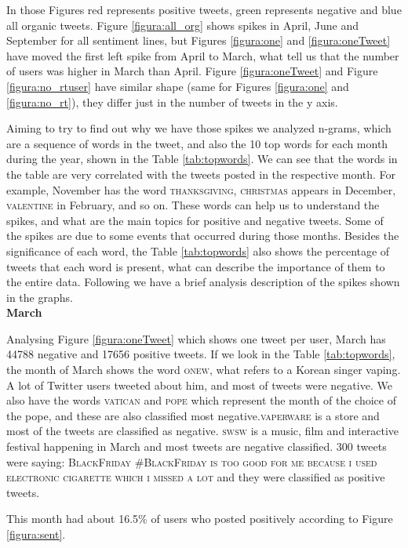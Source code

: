 \documentclass{sig-alternate}
\begin{document}
 In those Figures red represents positive tweets, green represents negative and blue all organic tweets. Figure \ref{figura:all_org} shows spikes in April, June and September for all sentiment lines, but Figures \ref{figura:one} and \ref{figura:oneTweet} have moved the first left spike from April to March, what tell us that the number of users was higher in March than April. Figure \ref{figura:oneTweet} and Figure \ref{figura:no_rtuser} have similar shape (same for 
Figures \ref{figura:one} and \ref{figura:no_rt}), they differ just in the number of tweets in the y axis. 

Aiming to try to find out why we have those spikes we analyzed n-grams, which are a sequence of words in the tweet, and also the 10 top words for each month during the year, shown in the Table \ref{tab:topwords}. We can see that the words in the table are very correlated with the tweets posted in the respective month. For example, November has the word \textsc{thanksgiving}, \textsc{christmas} appears in December, \textsc{valentine} in February, and so on. These words can help us to understand the spikes, and what are the main topics for positive and negative tweets. Some of the spikes are due to some events that occurred during those months. Besides the significance of each word, the Table \ref{tab:topwords} also shows the percentage of tweets that each word is present, what can describe the importance of them to the entire data. Following we have a brief analysis description of the spikes shown in the graphs. \\

\textbf{March}

Analysing Figure \ref{figura:oneTweet} which shows one tweet per user, March has 44788 negative and 17656 positive tweets. If we look in the Table \ref{tab:topwords}, the month of March shows the word \textsc{onew}, what refers to a Korean singer vaping. A lot of Twitter users tweeted about him, and most of tweets were negative. We also have the words \textsc{vatican} and \textsc{pope} which represent the month of the choice of the pope, and these are also classified most negative.\textsc{vaperware} is a store and most of the tweets are classified as negative. \textsc{swsw} is a music, film and interactive festival happening in March and most tweets are negative classified. 300 tweets were saying: \textsc{BlackFriday \#BlackFriday  is too good for me because i used electronic cigarette which  i missed a lot} and they were classified as positive tweets.

This month had about 16.5\% of users who posted positively according to Figure \ref{figura:sent}. \\
    
\end{document}
